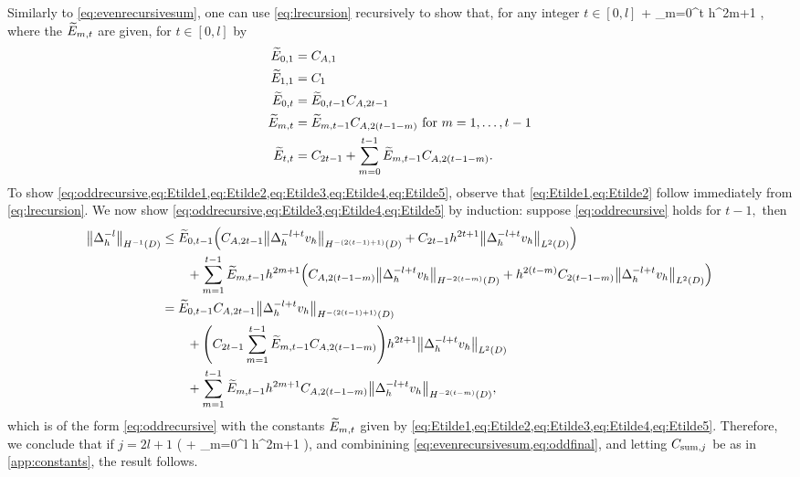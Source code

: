 Similarly to \cref{eq:evenrecursivesum}, one can use \cref{eq:lrecursion} recursively to show that, for any integer $t \in [0,l]$
\beq\label{eq:oddrecursive}
 \leq {}  + \sum_{m=0}^t  h^{2m+1}  ,
\eeq
where  the $\widetilde{E}_{m,t}$ are given, for $t \in [0,l]$ by
\begin{align}
\label{eq:Etilde1}\widetilde{E}_{0,1} &= C_{A,1}\\
\label{eq:Etilde2}\widetilde{E}_{1,1} &= C_{1}\\
\label{eq:Etilde3}\widetilde{E}_{0,t} &= \widetilde{E}_{0,t-1}C_{A,2t-1}\\
\label{eq:Etilde4}\widetilde{E}_{m,t} &= \widetilde{E}_{m,t-1}C_{A,2(t-1-m)}\text{ for } m = 1,\ldots,t-1\\
\label{eq:Etilde5}\widetilde{E}_{t,t} &= C_{2t-1} + \sum_{m=0}^{t-1}\widetilde{E}_{m,t-1}C_{A,2(t-1-m)}.\\
\end{align}
To show \cref{eq:oddrecursive,eq:Etilde1,eq:Etilde2,eq:Etilde3,eq:Etilde4,eq:Etilde5}, observe that \cref{eq:Etilde1,eq:Etilde2} follow immediately from \cref{eq:lrecursion}. We now show \cref{eq:oddrecursive,eq:Etilde3,eq:Etilde4,eq:Etilde5} by induction: suppose \cref{eq:oddrecursive} holds for $t-1,$ then
\begin{align*}
\NHmoD{\Deltah^{-l}} &\leq \Etildefn{0,t-1} \mleft(\CAfn{2t-1} \NHfn{-(2(t-1)+1)}{D}{\Deltah^{-l + t}\vh} +\Cfn{2t-1} h^{2t+1} \NLtD{\Deltah^{-l + t}\vh}\mright)\\
&\quad\quad+ \sum_{m=1}^{t-1} \Etildefn{m,t-1} h^{2m+1} \mleft(\CAfn{2(t-1-m)} \NHfn{-2(t-m)}{D}{\Deltah^{-l + t}\vh} + h^{2(t-m)} \Cfn{2(t-1-m)} \NLtD{\Deltah^{-l + t}\vh}\mright)\\
&= \Etildefn{0,t-1} \CAfn{2t-1} \NHfn{-(2(t-1)+1)}{D}{\Deltah^{-l + t}\vh}\\
&\quad\quad+ \mleft(\Cfn{2t-1}\sum_{m=1}^{t-1} \Etildefn{m,t-1}\CAfn{2(t-1-m)}\mright) h^{2t+1}\NLtD{\Deltah^{-l + t}\vh}\\
&\quad\quad+ \sum_{m=1}^{t-1} \Etildefn{m,t-1} h^{2m+1} \CAfn{2(t-1-m)}\NHfn{-2(t-m)}{D}{\Deltah^{-l + t}\vh},
\end{align*}
which is of the form \cref{eq:oddrecursive} with the constants $\widetilde{E}_{m,t}$ given by \cref{eq:Etilde1,eq:Etilde2,eq:Etilde3,eq:Etilde4,eq:Etilde5}. Therefore, we conclude that if $j = 2l+1$
\beq\label{eq:oddfinal}
 \leq {}\mleft(  + \sum_{m=0}^l  h^{2m+1}  \mright),
\eeq
and combinining \cref{eq:evenrecursivesum,eq:oddfinal}, and letting $C_{\mathrm{sum},j}$ be as in \cref{app:constants}, the result follows.%
\epf

